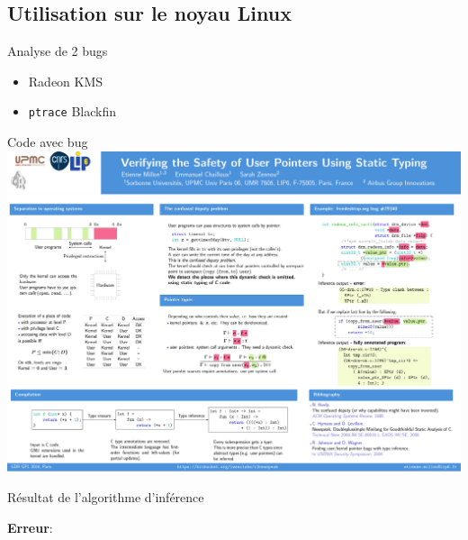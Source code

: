 \subsection{Utilisation sur le noyau Linux}

\begin{frame}{Analyse de 2 bugs}

    \begin{itemize}
        \item Radeon KMS
        \item \texttt{ptrace} Blackfin
    \end{itemize}
\end{frame}


\begin{frame}{Code avec bug}
    \includegraphics[trim=2300 1430 100 500,clip,width=\textwidth]{poster.pdf}
\end{frame}

\begin{frame}[fragile]{Résultat de l'algorithme d'inférence}

\textbf{Erreur}:

\end{frame}


